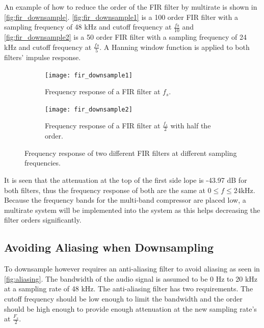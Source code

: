 An example of how to reduce the order of the FIR filter by multirate is shown in \autoref{fig:fir_downsample}. \autoref{fig:fir_downsample1} is a 100 order FIR filter with a sampling frequency of 48 kHz and cutoff frequency at $\frac{fs}{10}$ and \autoref{fig:fir_downsample2} is a 50 order FIR filter with a sampling frequency of 24 kHz and cutoff frequency at $\frac{fs}{5}$. A Hanning window function is applied to both filters' impulse response. 

\begin{figure}[H]
\centering
\begin{subfigure}[t]{0.44\textwidth}
\texttt{[image: fir\_downsample1]}
	\caption{Frequency response of a FIR filter at $f_s$.}
	\label{fig:fir_downsample1}
\end{subfigure}
\hspace{6mm} 
\begin{subfigure}[t]{0.47\textwidth}
\texttt{[image: fir\_downsample2]}
	\caption{Frequency response of a FIR filter at $\frac{f_s}{2}$ with half the order.}
	\label{fig:fir_downsample2}
\end{subfigure}
\caption{Frequency response of two different FIR filters at different sampling frequencies.}
\label{fig:fir_downsample}
\end{figure}

It is seen that the attenuation at the top of the first side lope is -43.97 dB for both filters, thus the frequency response of both are the same at $0 \leq f \leq 24 \text{kHz}$. Because the frequency bands for the multi-band compressor are placed low, a multirate system will be implemented into the system as this helps decreasing the filter orders significantly.

\subsection*{Avoiding Aliasing when Downsampling}
To downsample however requires an anti-aliasing filter to avoid aliasing as seen in \autoref{fig:aliasing}. The bandwidth of the audio signal is assumed to be 0 Hz to 20 kHz at a sampling rate of 48 kHz. The anti-aliasing filter has two requirements. The cutoff frequency should be low enough to limit the bandwidth and the order should be high enough to provide enough attenuation at the new sampling rate's at $\frac{F_s}{2}$. 

